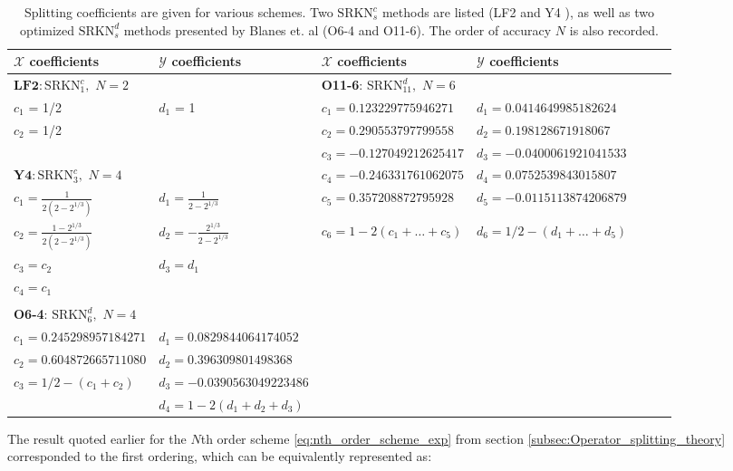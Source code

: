 \documentclass[11pt,titlepage]{report}
\newcommand{\ra}[1]{\renewcommand{\arraystretch}{#1}}
\begin{document}
\begin{table}
\ra{1.3}
\begin{tabular}{@{}lllllll@{}}\toprule[2 pt]
\phantom{a}$\mathcal{X}$ coefficients & $\mathcal{Y}$ coefficients &  $\mathcal{X}$ coefficients & $\mathcal{Y}$ coefficients & \\ \midrule
$\textbf{LF2}: \text{SRKN}_1^c, \,\, N = 2$ & & \textbf{O11-6}: $\text{SRKN}_{11}^d,\,\, N = 6$\\
 $c_1$ = 1/2 & $d_1$ = 1 &   $c_1 = 0.123229775946271 $ & $d_1 = 0.0414649985182624 $ &\\
$c_2$ = 1/2 &  &   $c_2 = 0.290553797799558 $ & $d_2 = 0.198128671918067  $ &\\
&&  $c_3 = -0.127049212625417$ & $d_3 = -0.0400061921041533 $ &\\
$\textbf{Y4}: \text{SRKN}_3^c,\,\, N = 4$ & & $c_4 = -0.246331761062075 $ & $d_4 = 0.0752539843015807 $ &\\
$c_1 =  \frac{1}{2(2 - 2^{1/3})}$ & $d_1 = \frac{1}{2 - 2^{1/3}}$ &  $c_5 = 0.357208872795928 $ & $d_5 = -0.0115113874206879$ &\\ 
$c_2 = \frac{1 - 2^{1/3}}{2(2 - 2^{1/3})}$   & $d_2 = -\frac{2^{1/3}}{2 - 2^{1/3}}$ & $c_6 = 1 - 2(c_1 + \ldots + c_5)$ & $d_6 = 1/2 - (d_1 + \ldots + d_5)$ &\\
$c_3 = c_2$   & $d_3 = d_1$ & \\
$c_4 = c_1$   &  \\
&&&\\
\textbf{O6-4}: $\text{SRKN}_6^d,\,\, N = 4$\\
$c_1 = 0.245298957184271$ & $d_1 = 0.0829844064174052 $ \\
$c_2 = 0.604872665711080$ & $d_2 = 0.396309801498368 $ \\
$c_3 = 1/2 - (c_1 + c_2)$ & $d_3 = -0.0390563049223486  $ \\
 & $d_4 = 1 - 2(d_1 + d_2 + d_3) $ \\
\bottomrule[2 pt]
\end{tabular}
\caption{Splitting coefficients are given for various schemes. Two $\text{SRKN}_s^c$ methods are listed (LF2 and Y4 \cite{Yoshida90}), as well as two optimized  $\text{SRKN}_s^d$ methods presented by Blanes et. al \cite{Blanes02} (O6-4 and O11-6). The order of accuracy $N$ is also recorded. }
\label{tbl:splitting_coefficients}
\end{table}

\newpage

The result quoted earlier for the $N$th order scheme \eqref{eq:nth_order_scheme_exp} from section \ref{subsec:Operator_splitting_theory} corresponded to the first ordering, which can be equivalently represented as:
\end{document}
